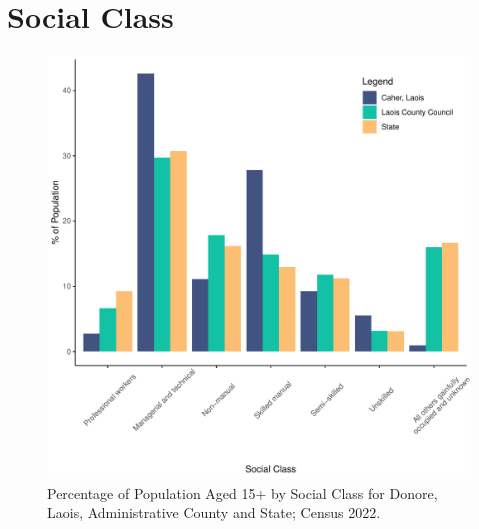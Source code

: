 \documentclass{article}
\begin{document}
\section{Social Class}\label{sect:SC}
\begin{figure}[H]
	\centering
	\includegraphics[width = 140mm]{../figures/SocialClassED.pdf}
	\caption{Percentage of Population Aged 15+ by Social Class for Donore, Laois, Administrative County and State; Census 2022.}
	\label{fig:vbnv}
	\end{figure}
\end{document}
